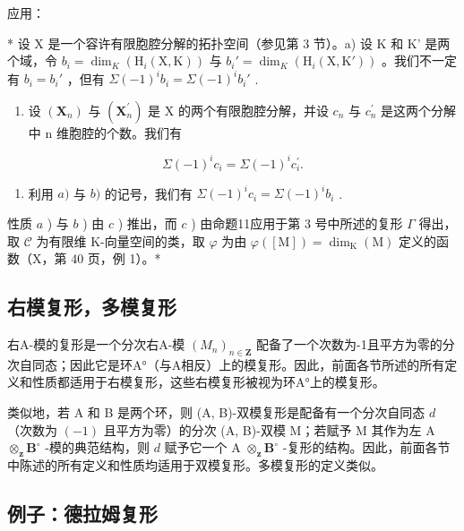 应用：

* 设 X 是一个容许有限胞腔分解的拓扑空间（参见第 3 节）。a) 设 K 和 K' 是两个域，令 \(b_i = \dim_K(\mathrm{H}_i(\mathrm{X}, \mathrm{K}))\) 与 \(b_i' = \dim_K(\mathrm{H}_i(\mathrm{X}, \mathrm{K}'))\) 。我们不一定有 \(b_i = b_i'\) ，但有 \(\Sigma(-1)^i b_i = \Sigma(-1)^i b_i'\) .

\begin{enumerate}
\def\labelenumi{\alph{enumi})}
\setcounter{enumi}{1}
\tightlist
\item
  设 \((\mathbf{X}_{n})\) 与 \((\mathbf{X}_{n}^{\prime})\) 是 X 的两个有限胞腔分解，并设 \(c_{n}\) 与 \(c_{n}^{\prime}\) 是这两个分解中 n 维胞腔的个数。我们有
\end{enumerate}

\[
\Sigma (- 1) ^ {i} c _ {i} = \Sigma (- 1) ^ {i} c _ {i} ^ {\prime}.
\]

\begin{enumerate}
\def\labelenumi{\alph{enumi})}
\setcounter{enumi}{2}
\tightlist
\item
  利用 \(a)\) 与 \(b)\) 的记号，我们有 \(\Sigma(-1)^{i} c_{i} = \Sigma(-1)^{i} b_{i}\) .
\end{enumerate}

性质 \(a\) ) 与 \(b\) ) 由 \(c\) ) 推出，而 \(c\) ) 由命题11应用于第 3 号中所述的复形 \(\Gamma\) 得出，取 \(\mathscr{C}\) 为有限维 K-向量空间的类，取 \(\varphi\) 为由 \(\varphi([\mathrm{M}]) = \dim_{\mathrm{K}}(\mathrm{M})\) 定义的函数（X，第 40 页，例 1）。*

\subsection{右模复形，多模复形}

右A-模的复形是一个分次右A-模 \((M_{n})_{n\in\mathbf{Z}}\) 配备了一个次数为-1且平方为零的分次自同态；因此它是环A°（与A相反）上的模复形。因此，前面各节所述的所有定义和性质都适用于右模复形，这些右模复形被视为环A°上的模复形。

类似地，若 A 和 B 是两个环，则 (A, B)-双模复形是配备有一个分次自同态 \(d\) （次数为 \((-1)\) 且平方为零）的分次 (A, B)-双模 M；若赋予 M 其作为左 A \(\otimes_{\mathbf{z}} \mathbf{B}^{\circ}\) -模的典范结构，则 \(d\) 赋予它一个 A \(\otimes_{\mathbf{z}} \mathbf{B}^{\circ}\) -复形的结构。因此，前面各节中陈述的所有定义和性质均适用于双模复形。多模复形的定义类似。

\subsection{例子：德拉姆复形}

